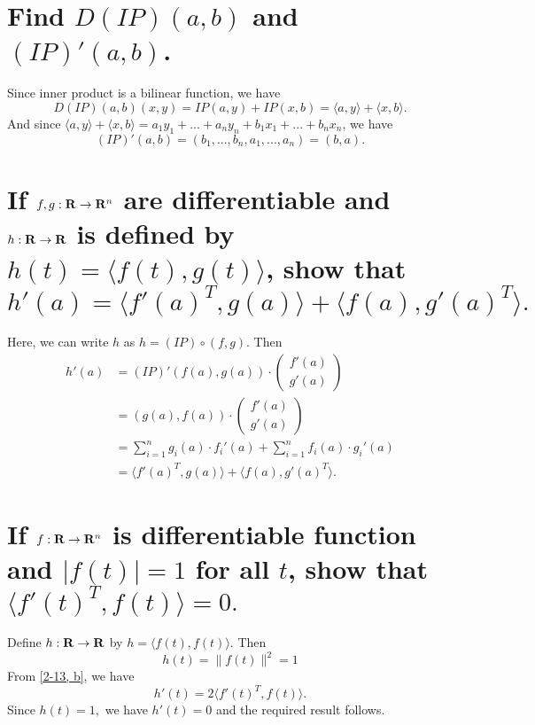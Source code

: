 \begin{parts}
    \part{
        Find $D(IP)(a,b)$ and $(IP)'(a,b)$.
    }
    \begin{solution}
        Since inner product is a bilinear
        function, we have
        $$D(IP)(a,b)(x,y)=IP(a,y)+IP(x,b)
        =\langle a,y\rangle
        +\langle x,b\rangle.
        $$
        And since $\langle a,y\rangle
        +\langle x,b\rangle=
        a_1y_1+...+a_ny_n+b_1x_1+
        ...+b_nx_n$, we have
        $$(IP)'(a,b)=(b_1,...,b_n,
        a_1,...,a_n)=(b,a).$$
    \end{solution}
    \part{
        \label{2-13, b}
        If $f,g:\mathbf{R}\to\mathbf{R}^n$ are
        differentiable
        and $h:\mathbf{R}\to\mathbf{R}$ is defined by
        $h(t)=\langle f(t),g(t)\rangle$,
        show that
        $$h'(a)=\langle f'(a)^T,g(a)\rangle
        +\langle f(a),g'(a)^T\rangle.$$
    }
    \begin{solution}
        Here, we can write $h$ as
        $h=(IP)\circ(f, g)$. Then
        \begin{align*}
            h'(a)&= (IP)'(f(a),g(a))\cdot
            \left(\begin{matrix}
                f'(a)\\g'(a)
            \end{matrix}\right)\\
            &=(g(a),f(a))\cdot
            \left(\begin{matrix}
                f'(a)\\g'(a)
            \end{matrix}\right)\\
            &=\sum_{i=1}^n
            {g_i(a)\cdot f_i'(a)}+
            \sum_{i=1}^n
            {f_i(a)\cdot g_i'(a)}\\
            &=\langle f'(a)^T,g(a)\rangle
            +\langle f(a),g'(a)^T\rangle.
        \end{align*}
    \end{solution}
    \part{
        If $f:\mathbf{R}\to\mathbf{R}^n$ is differentiable
        function and $\left\vert f(t)
        \right\vert=1$ for all $t$, show
        that $\langle f'(t)^T,f(t)
        \rangle = 0.$
    }
    \begin{solution}
        Define $h:\mathbf{R}\to\mathbf{R}$ by $h=\langle
        f(t),f(t)\rangle.$ Then
        $$h(t)=\lVert f(t)\rVert ^2=1$$
        From \ref{2-13, b}, we have
        $$h'(t)=2\langle f'(t)^T,f(t)
        \rangle.$$
        Since $h(t)=1,$ we have
        $ h'(t)=0$ and the
        required result follows.
    \end{solution}

\end{parts}
